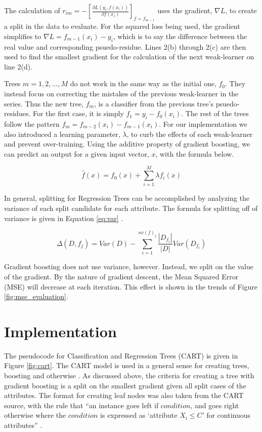 \documentclass[letterpaper]{article} %
\begin{document}
The calculation of $
r_{im} =
-\left[
\frac{\partial L(y_i,f(x_i))}{\partial f(x_i)}
\right]_{f=f_{m - 1}}
$
uses the gradient, $\nabla L$, to create a split in the data to evaluate.
For the squared loss being used, the gradient simplifies to
$\nabla L = f_{m-1}(x_i) - y_i$,
which is to say the difference between the real value
and corresponding psuedo-residue.
Lines 2(b) through 2(c) are then used to find the smallest gradient
for the calculation of the next weak-learner on line 2(d).

Trees $m = 1,2,\dots,M$ do not work in the same way as the initial one, $f_0$.
They instead focus on correcting the mistakes of the previous weak-learner
in the series.
Thus the new tree, $f_m$, is a classifier from the previous tree's psuedo-residues.
For the first case, it is simply $f_1 = y_i - f_{0}(x_i)$.
The rest of the trees follow the pattern
$f_m = f_{m-2}(x_i) - f_{m-1}(x_i)$.
For our implementation we also introduced
a learning parameter, $\lambda$, to curb the effects
of each weak-learner and prevent over-training.
Using the additive property of gradient boosting,
we can predict an output for a given input vector, $x$,
with the formula below.

$$\hat{f}(x) = f_0(x) + \sum_{i = 1}^M\lambda f_{i}(x)$$

In general, splitting for Regression Trees can be accomplished by
analyzing the variance of each split candidate for each attribute.
The formula for splitting off of variance is given in Equation \ref{eq:var}
\cite{kalita}.

\begin{equation}
\label{eq:var}
\Delta(D,f_j) = Var(D) - \sum_{i=1}^{nv(f)_j}\frac{|D_{f_i}|}{|D|}Var(D_{f_i})
\end{equation}

Gradient boosting does not use variance, however. Instead, we split on the value of the gradient.
By the nature of gradient descent, the Mean Squared Error (MSE) will decrease at each iteration.
This effect is shown in the trends of Figure \ref{fig:mse_evaluation}.

\section{Implementation}
The pseudocode for Classification and Regression Trees (CART) is given in Figure \ref{fig:cart}.
The CART model is used in a general sense for creating trees, boosting and otherwise
\cite{cart}.
As discussed above, the criteria for creating a tree with gradient boosting
is a split on the smallest gradient given all split cases of the attributes.
The format for creating leaf nodes was also taken from the CART source,
with the rule that ``an instance goes left if $condition$, and goes right otherwise
where the $condition$ is expressed as `attribute $X_i \leq C$' for continuous attributes'' \cite{top10}.
\end{document}
